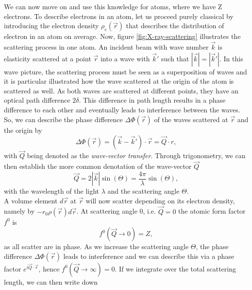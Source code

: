 We can now move on and use this knowledge for atoms, where we have Z electrons. To describe electrons in an atom, let us proceed purely classical by introducing the electron density $\rho_{e}\left(\vec{r}\right)$ that describes the distribution of electron in an atom on average. Now, figure \ref{fig:X-ray-scattering} illustrates the scattering process in one atom. An incident beam with wave number $\vec{k}$ is elasticity scattered at a point $\vec{r}$ into a wave with $\vec{k}'$ such that $\left|\vec{k}\right|=\left|\vec{k}'\right|$. In this wave picture, the scattering process must be seen as a superposition of waves and it is particular illustrated how the wave scattered at the origin of the atom is scattered as well. As both waves are scattered at different points, they have an optical path difference $2 \delta$. This difference in path length results in a phase difference to each other and eventually leads to interference between the waves. So, we can describe the phase difference $\Delta \Phi\left(\vec{r}\right)$ of the waves scattered at $\vec{r}$ and the origin by
\begin{equation}
\Delta \Phi\left(\vec{r}\right) = \left(\vec{k}-\vec{k}'\right)\cdot \vec{r} = \vec{Q} \cdot r,
\label{eq:phase-difference}
\end{equation}
with $\vec{Q}$ being denoted as the \textit{wave-vector transfer}. Through trigonometry, we can then establish the more common denotation of the wave-vector $\vec{Q}$
\begin{equation}
\vec{Q}=2 \left|\vec{k}\right| \sin\left(\Theta\right)=\frac{4 \pi}{\lambda}\sin\left(\Theta\right),
\label{eq:Q-scattering-angle}
\end{equation}
with the wavelength of the light $\lambda$ and the scattering angle $\Theta$.\\
A volume element $d\vec{r}$ at $\vec{r}$ will now scatter depending on its electron density, namely by $-r_{0}\rho\left(\vec{r}\right)d\vec{r}$. At scattering angle 0, i.e. $\vec{Q}=0$ the atomic form factor $f^{0}$ is
\begin{equation}
f^{0}\left(\vec{Q}\rightarrow 0\right)=Z,
\label{eq:transform-number-of-particles}
\end{equation}
as all scatter are in phase. As we increase the scattering angle $\Theta$, the phase difference $\Delta \Phi\left(\vec{r}\right)$ leads to interference and we can describe this via a phase factor $e^{i \vec{Q}\cdot \vec{r}}$, hence $f^{0}\left(\vec{Q}\rightarrow\infty\right)=0$. If we integrate over the total scattering length, we can then write down
